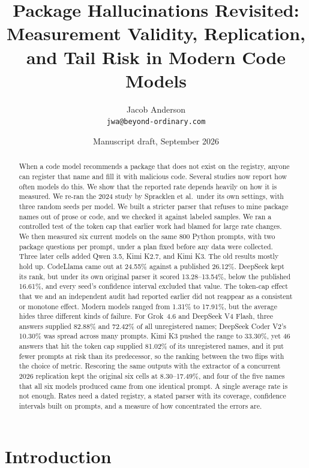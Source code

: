 \documentclass[10pt,twocolumn,letterpaper]{article}
\title{\Large\bfseries Package Hallucinations Revisited: Measurement Validity, Replication, and Tail Risk in Modern Code Models}
\author{Jacob Anderson\\ \small\texttt{jwa@beyond-ordinary.com}}
\date{\small Manuscript draft, September 2026}
\begin{document}
\maketitle

\begin{abstract}
When a code model recommends a package that does not exist on the registry, anyone can register
that name and fill it with malicious code. Several studies now report how often models do this. We
show that the reported rate depends heavily on how it is measured. We re-ran the 2024 study by
Spracklen et al.\ under its own settings, with three random seeds per model. We built a stricter
parser that refuses to mine package names out of prose or code, and we checked it against labeled
samples. We ran a controlled test of the token cap that earlier work had blamed for large rate
changes. We then measured six current models on the same 800 Python prompts, with two package
questions per prompt, under a plan fixed before any data were collected. Three later cells added
Qwen 3.5, Kimi K2.7, and Kimi K3. The old results mostly hold up. CodeLlama came out at 24.55\%
against a published 26.12\%. DeepSeek kept its rank, but under its own original parser it scored
13.28--13.54\%, below the published 16.61\%, and every seed's confidence interval excluded that
value. The token-cap effect that we and an independent audit had reported earlier
\citep{anderson2026replication,codex2026audit} did not reappear as a consistent or monotone effect.
Modern models ranged from 1.31\% to 17.91\%, but the average hides three different kinds of failure.
For Grok~4.6 and DeepSeek V4 Flash, three answers supplied 82.88\% and 72.42\% of all unregistered
names; DeepSeek Coder V2's 10.30\% was spread across many prompts. Kimi K3 pushed the range to
33.30\%, yet 46 answers that hit the token cap supplied 81.02\% of its unregistered names, and it put
fewer prompts at risk than its predecessor, so the ranking between the two flips with the choice of
metric. Rescoring the same outputs with the extractor of a concurrent 2026 replication kept the
original six cells at 8.30--17.49\%, and four of the five names that all six models produced came
from one identical prompt. A single average rate is not enough. Rates need a dated registry, a stated
parser with its coverage, confidence intervals built on prompts, and a measure of how concentrated
the errors are.
\end{abstract}

\section{Introduction}
\label{sec:intro}
\end{document}
